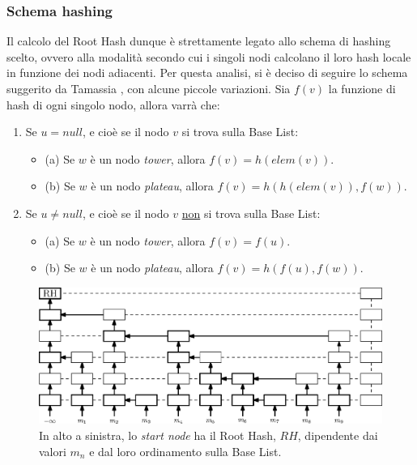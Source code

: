 		\subsubsection{Schema hashing}
	
	
		Il calcolo del Root Hash dunque è strettamente legato allo schema di hashing scelto, ovvero alla modalità secondo cui i singoli nodi calcolano il loro hash locale in funzione dei nodi adiacenti. Per questa analisi, si è deciso di seguire lo schema suggerito da Tamassia \cite{authskiplist}, con alcune piccole variazioni. 
		Sia $ f(v) $ la funzione di hash di ogni singolo nodo, allora varrà che:
		
		\begin{enumerate}
			\item Se $ u = null $, e cioè se il nodo $ v $ si trova sulla Base List:
				\begin{itemize}
					\item (a) Se $ w $ è un nodo \textit{tower}, allora $ f(v) = h(elem(v)) $.
					\item (b) Se $ w $ è un nodo \textit{plateau}, allora  $ f(v) = h(h(elem(v)), f(w)) $.
				\end{itemize}
			\item Se $ u \ne null $, e cioè se il nodo $ v $ \underline{non} si trova sulla Base List:
				\begin{itemize}
					\item (a) Se $ w $ è un nodo \textit{tower}, allora $ f(v) = f(u) $. 
					\item (b) Se $ w $ è un nodo \textit{plateau}, allora  $ f(v) = h(f(u), f(w)) $. 
				\end{itemize}
		\end{enumerate}
	
		\begin{figure}
			\centering
			\includegraphics[scale=0.6]{figure/hashFlow.eps}
			\caption{In alto a sinistra, lo \textit{start node} ha il Root Hash, $ RH $, dipendente dai valori $ m_{n} $ e dal loro ordinamento sulla Base List.}\label{fig:6}
		\end{figure}
	
